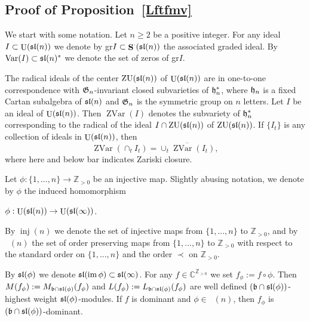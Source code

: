 \documentclass[10pt]{amsart}\oddsidemargin -1mm \evensidemargin -1mm \topmargin -15mm\headheight5mm \headsep 3.5mm \textheight 245mm\textwidth 170mm %
\theoremstyle{definition}\newtheorem{theorem}{Theorem}[section]\newtheorem{lemma}[theorem]{Lemma}\newtheorem{remark}[theorem]{Remark}\newtheorem{proposition}[theorem]{Proposition}\newtheorem{corollary}[theorem]{Corollary}\newtheorem{definition}[theorem]{Definition}\newtheorem{Ex}[theorem]{Example}
\DeclareMathOperator{\Ima}{\mathrm{im}}\DeclareMathOperator{\RS}{\mathrm{RS}}\DeclareMathOperator{\wid}{A}\DeclareMathOperator{\nint}{\alpha}\DeclareMathOperator{\Lfai}{\mathrm{Lfai}}\DeclareMathOperator{\APAut}{\mathrm{Aut}}\DeclareMathOperator{\APcork}{\mathrm{cork}}\DeclareMathOperator{\VAnn}{\mathrm{VAnn}}\DeclareMathOperator{\APrk}{\mathrm{rk}}\DeclareMathOperator{\Sa}{\mathbf{S}}\DeclareMathOperator{\I}{I}\DeclareMathOperator{\Hom}{\mathrm{Hom}}\DeclareMathOperator{\Sh}{\mathrm{Sh}}\DeclareMathOperator{\Q}{\mathrm{Q}}\DeclareMathOperator{\Irr}{\mathrm{Irr}}\DeclareMathOperator{\Ue}{\mathrm{U}}\DeclareMathOperator{\seq}{\mathrm{seq}}\DeclareMathOperator{\tr}{\mathrm{tr}}\DeclareMathOperator{\Ss}{\mathrm{S}}\DeclareMathOperator{\cls}{\mathrm{cls}}\DeclareMathOperator{\Ind}{\mathrm{Ind}}\DeclareMathOperator{\Fss}{\mathrm{FSet}}\DeclareMathOperator{\injo}{\mathrm{inj_0}}\DeclareMathOperator{\Ver}{{\it M}}\DeclareMathOperator{\Adj}{\mathrm{Adj}}\DeclareMathOperator{\APinj}{\mathrm{inj}}\DeclareMathOperator{\Ann}{\mathrm{Ann}}\DeclareMathOperator{\ZAnn}{\mathrm{ZAnn}}\DeclareMathOperator{\ZUe}{\mathrm{ZU}}\DeclareMathOperator{\Var}{\mathrm{Var}}\DeclareMathOperator{\ZVar}{\mathrm{ZVar}}
\newcounter{AP}
\begin{document}

\subsection{Proof of Proposition~\ref{Lftfmv}}\label{SSpffmv}
We start with some notation. Let $n\ge2$ be a positive integer. For any ideal $I\subset\Ue(\frak{sl}(n))$ we denote by
gr$I\subset\Sa^\cdot(\frak{sl}(n))$ the associated graded ideal. By $\Var(I)\subset\frak{sl}(n)^*$ we denote the set of zeros of gr$I$.

The radical ideals of the center
$\ZUe(\frak{sl}(n))$ of $\Ue(\frak{sl}(n))$ are in one-to-one
correspondence with $\frak G_n$-invariant closed subvarieties of $\frak
h_n^*$, where $\frak h_n$ is a fixed Cartan subalgebra of $\frak{sl}(n)$ and $\frak G_n$ is the symmetric group on $n$ letters. Let
$I$ be an ideal of $\Ue(\frak{sl}(n))$. Then $\ZVar(I)$ denotes the subvariety of $\frak h_n^*$
corresponding to the radical of the ideal $I\cap\ZUe(\frak{sl}(n))$ of $\ZUe(\frak{sl}(n))$. If
$\{I_t\}$ is any collection of ideals in $\Ue(\frak{sl}(n))$, then
\begin{equation}\ZVar(\cap_tI_t)=\overline{\cup_t\ZVar(I_t)}\label{Ezv},\end{equation} where here and below bar indicates Zariski closure.

Let $\phi: \{1,..., n\}\to \mathbb Z_{>0}$ be an injective map.
Slightly abusing notation, we denote %
by $\phi$ the induced homomorphism\begin{center}$\phi:
\Ue(\frak{sl}(n))\to\Ue(\frak{sl}(\infty))$.\end{center}
By $\APinj(n)$ we denote the set of injective maps from $\{1,..., n\}$ to $\mathbb Z_{>0}$, and by $\injo(n)$ the set of order preserving maps from $\{1,..., n\}$ to $\mathbb Z_{>0}$ with respect to the standard order on $\{1,..., n\}$ and the order $\prec$ on $\mathbb Z_{>0}$.

By $\frak{sl}(\phi)$ we denote $\frak{sl}(\Ima\phi)\subset\frak{sl}(\infty)$. For any $f\in \mathbb C^{\mathbb Z_{>0}}$ we set $f_\phi:=f\circ\phi$. Then $M(f_\phi):=M_{\frak b\cap\frak{sl}(\phi)}(f_\phi)$ and $L(f_\phi):=L_{\frak b\cap\frak{sl}(\phi)}(f_\phi)$ are well defined $(\frak b\cap\frak{sl}(\phi))$-highest weight $\frak{sl}(\phi)$-modules. If $f$ is dominant and $\phi\in\injo(n)$, then $f_\phi$ is $(\frak b\cap\frak{sl}(\phi))$-dominant. %
\end{document}

